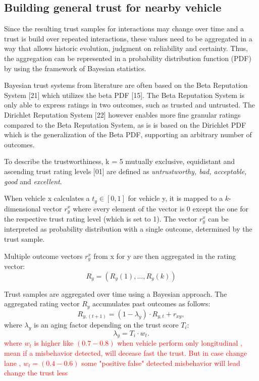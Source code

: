 \documentclass[letterpaper, 10pt, conference]{ieeeconf}  %
\begin{document}
\subsection{Building general trust for nearby vehicle}
Since the resulting trust samples for interactions may change over time and a trust is build over repeated interactions, these values need to be aggregated in a way that allows historic evolution, judgment on reliability and
certainty. Thus, the aggregation can be represented in a probability distribution function (PDF) by using the framework
of Bayesian statistics.


Bayesian trust systems from literature are often based on the Beta Reputation System [21] which utilizes the beta PDF [15]. The Beta Reputation System is only able to express ratings in two outcomes, such as trusted and untrusted. The Dirichlet Reputation System [22] however
enables more fine granular ratings compared to the Beta Reputation System, as is is based on the Dirichlet PDF which is the generalization of the Beta PDF, supporting an arbitrary number of outcomes.


To describe the trustworthiness, k = 5 mutually exclusive, equidistant and ascending trust rating levels [01] are defined as \textit{untrustworthy, bad, acceptable, good } and \textit{excellent}.

When vehicle x calculates a $t_y \in [0, 1]$ for vehicle y, it is mapped to a $k$-dimensional vector $r_y^x$ where every element of the vector is 0 except the one for the respective trust rating level (which is set to 1). The vector $r_y^x$ can be interpreted as probability distribution with a single outcome, determined
by the trust sample. 

Multiple outcome vectors $r_y^x$ from x for y are then aggregated in the rating vector:
\begin{equation}
    R_y = (R_y(1), . . . , R_y(k))
\end{equation}


Trust samples are aggregated over time using a Bayesian approach. The aggregated rating vector $R_y$ accumulates past outcomes as follows:
\begin{equation}
    R_{y,(t+1)} = (1 - \lambda_y) \cdot R_{y,t} + r_{xy},
\end{equation}
where $\lambda_y$ is an aging factor depending on the trust score $T_i$:
\begin{equation}
    \lambda_y = T_i \cdot w_t.
\end{equation}
\textcolor{red}{where $w_t$ is higher like $(0.7 - 0.8)$ when vehicle perform only longitudinal , mean if a misbehavior detected, will decease fast the trust. But in case change lane , $w_t = ( 0.4 - 0.6)$ some "positive false" detected misbehavior will lead change the trust less}
\end{document}
